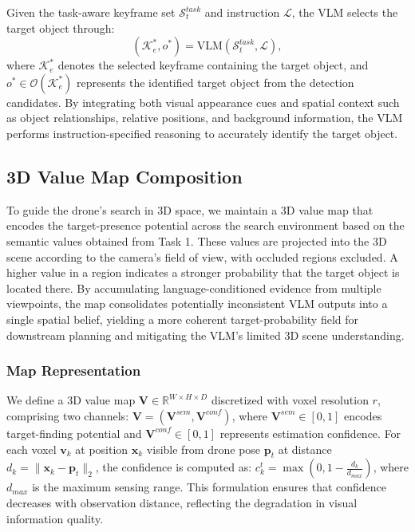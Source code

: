 Given the task-aware keyframe set $\mathcal{S}_t^{task}$ and instruction $\mathcal{L}$, the VLM selects the target object through:
\begin{equation}
    (\mathcal{K}_e^*, o^*) = \text{VLM}(\mathcal{S}_t^{task}, \mathcal{L}),
\end{equation}
\noindent where $\mathcal{K}_e^*$ denotes the selected keyframe containing the target object, and $o^* \in \mathcal{O}(\mathcal{K}_e^*)$ represents the identified target object from the detection candidates. By integrating both visual appearance cues and spatial context such as object relationships, relative positions, and background information, the VLM performs instruction-specified reasoning to accurately identify the target object.


\subsection{3D Value Map Composition}\label{IV-C}
To guide the drone's search in 3D space, we maintain a 3D value map that encodes the target-presence potential across the search environment based on the semantic values obtained from Task 1. These values are projected into the 3D scene according to the camera's field of view, with occluded regions excluded. A higher value in a region indicates a stronger probability that the target object is located there. By accumulating language-conditioned evidence from multiple viewpoints, the map consolidates potentially inconsistent VLM outputs into a single spatial belief, yielding a more coherent target-probability field for downstream planning and mitigating the VLM’s limited 3D scene understanding.
\subsubsection{Map Representation}
We define a 3D value map $\mathbf{V} \in \mathbb{R}^{W \times H \times D}$ discretized with voxel resolution $r$, comprising two channels: $\mathbf{V} = (\mathbf{V}^{sem}, \mathbf{V}^{conf})$, where $\mathbf{V}^{sem} \in [0,1]$ encodes target-finding potential and $\mathbf{V}^{conf} \in [0,1]$ represents estimation confidence.
For each voxel $\mathbf{v}_k$ at position $\mathbf{x}_k$ visible from drone pose $\mathbf{p}_t$ at distance $d_k = \|\mathbf{x}_k - \mathbf{p}_t\|_2$, the confidence is computed as:
$c_k^t = \max\left(0, 1 - \frac{d_k}{d_{max}}\right)$, where $d_{max}$ is the maximum sensing range. This formulation ensures that confidence decreases with observation distance, reflecting the degradation in visual information quality.

